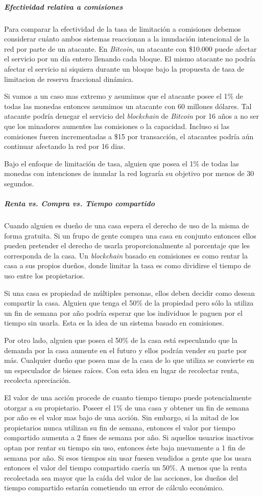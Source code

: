 \documentclass[a4paper,titlepage,final]{article}
\begin{document}
\subparagraph{Efectividad relativa a comisiones}

Para comparar la efectividad de la tasa de limitación a comisiones debemos considerar cuánto ambos sistemas reaccionan a la inundación intencional de la red por parte de un atacante. En \textit{Bitcoin}, un atacante con \$10.000 puede afectar el servicio por un día entero llenando cada bloque. El mismo atacante no podría afectar el servicio ni siquiera durante un bloque bajo la propuesta de tasa de limitacion de reserva fraccional dinámica.

Si vamos a un caso mas extremo y asumimos que el atacante posee el 1\% de todas las monedas entonces asumimos un atacante con 60 millones dólares. Tal atacante podría denegar el servicio del \textit{blockchain} de \textit{Bitcoin} por 16 años a no ser que los minadores aumentes las comisiones o la capacidad. Incluso si las comisiones fueren incrementadas a \$15 por transacción, el atacantes podría aún continuar afectando la red por 16 dias.

Bajo el enfoque de limitación de tasa, alguien que posea el 1\% de todas las monedas con intenciones de inundar la red lograría su objetivo por menos de 30 segundos.

\subparagraph{Renta vs. Compra vs. Tiempo compartido}

Cuando alguien es dueño de una casa espera el derecho de uso de la misma de forma gratuita. Si un frupo de gente compra una casa en conjunto entonces ellos pueden pretender el derecho de usarla proporcionalmente al porcentaje que les corresponda de la casa. Un \textit{blockchain} basado en comisiones es como rentar la casa a sus propios dueños, donde limitar la tasa es como dividirse el tiempo de uso entre los propietarios.

Si una casa es propiedad de múltiples personas, ellos deben decidir como desean compartir la casa. Alguien que tenga el 50\% de la propiedad pero sólo la utiliza un fin de semana por año podría esperar que los individuos le paguen por el tiempo sin usarla. Esta es la idea de un sistema basado en comisiones.

Por otro lado, alguien que posea el 50\% de la casa está especulando que la demanda por la casa aumente en el futuro y ellos podrán vender su parte por más. Cualquier dueño que posea mas de la casa de lo que utiliza se convierte en un especulador de bienes raíces. Con esta idea en lugar de recolectar renta, recolecta apreciación.

El valor de una acción procede de cuanto tiempo tiempo puede potencialmente otorgar a su propietario. Poseer el 1\% de una casa y obtener un fin de semana por año es el valor mas bajo de una acción. Sin embargo, si la mitad de los propietarios nunca utilizan su fin de semana, entonces el valor por tiempo compartido aumenta a 2 fines de semana por año. Si aquellos usuarios inactivos optan por rentar su tiempo sin uso, entonces éste baja nuevamente a 1 fin de semana por año. Si esos tiempos sin usar fuesen vendidos a gente que los usara entonces el valor del tiempo compartido caería un 50\%. A menos que la renta recolectada sea mayor que la caída del valor de las acciones, los dueños del tiempo compartido estarán cometiendo un error de cálculo económico.
\end{document}
